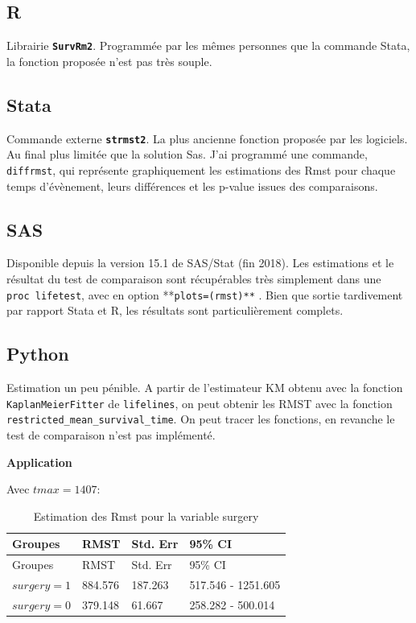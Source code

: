 \documentclass[
  12pt,
  letterpaper,
  DIV=11,
  numbers=noendperiod,
  onepage,
  openany]{scrreprt}
\begin{document}
\subsection{R}

Librairie \textbf{\texttt{SurvRm2}}. Programmée par les mêmes personnes
que la commande Stata, la fonction proposée n'est pas très souple.

\subsection{Stata}

Commande externe \textbf{\texttt{strmst2}}. La plus ancienne fonction
proposée par les logiciels. Au final plus limitée que la solution Sas.
J'ai programmé une commande, \texttt{diffrmst}, qui représente
graphiquement les estimations des Rmst pour chaque temps d'évènement,
leurs différences et les p-value issues des comparaisons.

\subsection{SAS}

Disponible depuis la version 15.1 de SAS/Stat (fin 2018). Les
estimations et le résultat du test de comparaison sont récupérables très
simplement dans une \texttt{proc\ lifetest}, avec en option
**\texttt{plots=(rmst)**} . Bien que sortie tardivement par rapport
Stata et R, les résultats sont particulièrement complets.

\subsection{Python}

Estimation un peu pénible. A partir de l'estimateur KM obtenu avec la
fonction \texttt{KaplanMeierFitter} de \texttt{lifelines}, on peut
obtenir les RMST avec la fonction
\texttt{restricted\_mean\_survival\_time}. On peut tracer les fonctions,
en revanche le test de comparaison n'est pas implémenté.

\textbf{Application}

Avec \(tmax=1407\):

\begin{longtable}[]{@{}llll@{}}
\caption{Estimation des Rmst pour la variable surgery}\tabularnewline
\toprule\noalign{}
Groupes & RMST & Std. Err & 95\% CI \\
\midrule\noalign{}
\endfirsthead
\toprule\noalign{}
Groupes & RMST & Std. Err & 95\% CI \\
\midrule\noalign{}
\endhead
\bottomrule\noalign{}
\endlastfoot
\(surgery=1\) & 884.576 & 187.263 & 517.546 - 1251.605 \\
\(surgery=0\) & 379.148 & 61.667 & 258.282 - 500.014 \\
\end{longtable}
\end{document}
